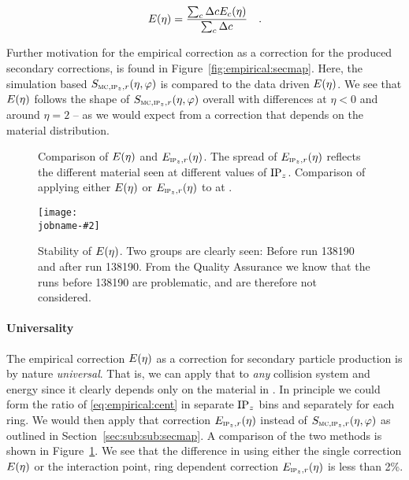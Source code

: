 \documentclass[compat,11pt]{alicenote}
\newcommand*{\etaphi}{\ensuremath(\eta,\varphi)}
\newcommand*\SecMap{\ensuremath S_{\subMC,\subIPz,r}\etaphi}
\newcommand*\EmpCor[1][]{\ensuremath E\ifx|#1|\relax\else_{#1}\fi(\eta)}
\newcommand{\secref}[1]{Section~\ref{#1}}
\newcommand{\figref}[1]{Figure~\ref{#1}}
\newcommand\figinput[2][\textwidth]{%
  \texttt{[image: \\jobname-\#2]}}
\begin{document}
\begin{equation}
  \label{eq:empirical}
  \EmpCor{} = \frac{\sum_c \Delta c\EmpCor[c]{}}{\sum_c \Delta c}\quad.
\end{equation}

Further motivation for the empirical correction as a correction
for the produced secondary corrections, is found in
\figref{fig:empirical:secmap}.  Here, the simulation based $\SecMap$
is compared to the data driven $\EmpCor$.  We see that $\EmpCor$
follows the shape of $\SecMap$ overall with differences at $\eta<0$
and around $\eta=2$ -- as we would expect from a correction that
depends on the material distribution. 

\begin{figure}[h!tbp]
  \centering
  \subfigure[]{
    \label{fig:empirical:compare_es}\figinput[.55\linewidth]{compare_es}}
  \subfigure[]{
    \label{fig:empirical:es_pp0900}\figinput[.35\linewidth]{es_pp0900}}
  \caption{ Comparison of $\EmpCor$ and
    $\EmpCor[\subIPz,r]{}$.  The spread of $\EmpCor[\subIPz,r]{}$
    reflects the different material seen at different values of
    $\IPz$.    Comparison of applying
    either $\EmpCor$ or $\EmpCor[\subIPz,r]{}$ to \ppCol{} at
    . }
  \label{fig:empirical:methods}
\end{figure}
\begin{figure}[h!tbp]
  \centering
  \figinput[.9\linewidth]{empcor_stable}
  \caption{Stability of $\EmpCor$.  Two groups are clearly seen:
    Before run 138190 and after run 138190.  From the Quality
    Assurance we know that the runs before 138190 are problematic, and
    are therefore not considered. }
  \label{fig:empirical:empcor_stable}
\end{figure}



\paragraph{Universality} The empirical correction $\EmpCor$ as a
correction for secondary particle production is by nature
\emph{universal}.  That is, we can apply that to \emph{any} collision
system and energy since it clearly depends only on the material in
\ALICE{}.  In principle we could form the ratio of
\eqref{eq:empirical:cent} in separate $\IPz$ bins and separately for
each \FMD{} ring.  We would then apply that correction
$\EmpCor[\subIPz,r]{}$ instead of $\SecMap$ as outlined in
\secref{sec:sub:sub:secmap}.  A comparison of the two methods is shown
in \figref{fig:empirical:methods}.  We see that the difference in
using either the single correction $\EmpCor$ or the interaction point,
ring dependent correction $\EmpCor[\subIPz,r]{}$ is less than 2\%. 
\end{document}
